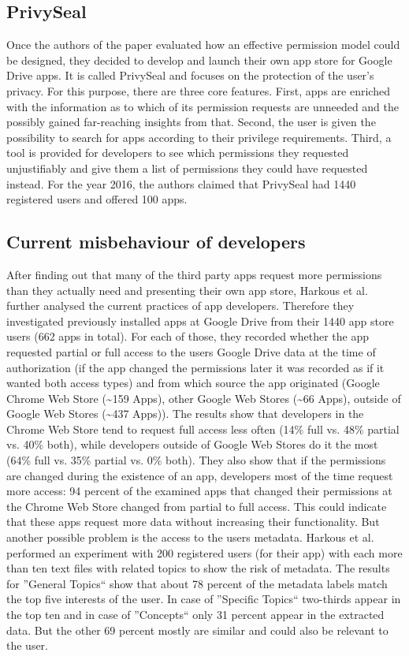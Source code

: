\documentclass[11pt,twocolumn,a4paper,DIV=calc]{scrartcl}
\begin{document}
\subsection{PrivySeal} 
Once the authors of the paper evaluated how an effective permission model could be designed, they decided to develop and launch their own app store for Google Drive apps. It is called PrivySeal and focuses on the protection of the user's privacy. For this purpose, there are three core features. First, apps are enriched with the information as to which of its permission requests are unneeded and the possibly gained far-reaching insights from that. Second, the user is given the possibility to search for apps according to their privilege requirements. Third, a tool is provided for developers to see which permissions they requested unjustifiably and give them a list of permissions they could have requested instead. For the year 2016, the authors claimed that PrivySeal had 1440 registered users and offered 100 apps. 
\subsection{Current misbehaviour of developers}
After finding out that many of the third party apps request more permissions than they actually need and presenting their own app store, Harkous et al. further analysed the current practices of app developers. Therefore they investigated previously installed apps at Google Drive from their 1440 app store users (662 apps in total). For each of those, they recorded whether the app requested partial or full access to the users Google Drive data at the time of authorization (if the app changed the permissions later it was recorded as if it wanted both access types) and from which source the app originated (Google Chrome Web Store (\textasciitilde 159 Apps), other Google Web Stores (\textasciitilde 66 Apps), outside of Google Web Stores (\textasciitilde 437 Apps)). 
The results show that developers in the Chrome Web Store tend to request full access less often (14\% full vs. 48\% partial vs. 40\% both), while developers outside of Google Web Stores do it the most (64\% full vs. 35\% partial vs. 0\% both). They also show that if the permissions are changed during the existence of an app, developers most of the time request more access: 94 percent of the examined apps that changed their permissions at the Chrome Web Store changed from partial to full access. This could indicate that these apps request more data without increasing their functionality. But another possible problem is the access to the users metadata. Harkous et al. performed an experiment with 200 registered users (for their app) with each more than ten text files with related topics to show the risk of metadata. The results for ''General Topics`` show that about 78 percent of the metadata labels match the top five interests of the user. In case of ''Specific Topics`` two-thirds appear in the top ten and in case of ''Concepts`` only 31 percent appear in the extracted data. But the other 69 percent mostly are similar and could also be relevant to the user. 
\end{document}
